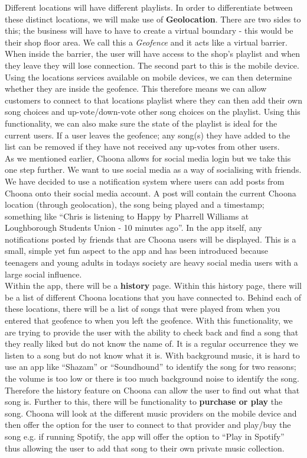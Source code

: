 Different locations will have different playlists.  In order to differentiate between these distinct locations, we will make use of \textbf{Geolocation}.  There are two sides to this; the business will have to have to create a virtual boundary - this would be their shop floor area.  We call this a \emph{Geofence} and it acts like a virtual barrier.  When inside the barrier, the user will have access to the shop's playlist and when they leave they will lose connection.  The second part to this is the mobile device.  Using the locations services available on mobile devices, we can then determine whether they are inside the geofence.  This therefore means we can allow customers to connect to that locations playlist where they can then add their own song choices and up-vote/down-vote other song choices on the playlist.  
Using this functionality, we can also make sure the state of the playlist is ideal for the current users.  If a user leaves the geofence; any song(s) they have added to the list can be removed if they have not received any up-votes from other users. \\

As we mentioned earlier, Choona allows for social media login but we take this one step further.  We want to use social media as a way of socialising with friends.  We have decided to use a notification system where users can add posts from Choona onto their social media account.  A post will contain the current Choona location (through geolocation), the song being played and a timestamp; something like ``Chris is listening to Happy by Pharrell Williams at Loughborough Students Union - 10 minutes ago''.    In the app itself, any notifications posted by friends that are Choona users will be displayed.  This is a small, simple yet fun aspect to the app and has been introduced because teenagers and young adults in todays society are heavy social media users with a large social influence.  \\

Within the app, there will be a \textbf{history} page.  Within this history page, there will be a list of different Choona locations that you have connected to.  Behind each of these locations, there will be a list of songs that were played from when you entered that geofence to when you left the geofence.  With this functionality, we are trying to provide the user with the ability to check back and find a song that they really liked but do not know the name of.  It is a regular occurrence they we listen to a song but do not know what it is.  With background music, it is hard to use an app like ``Shazam'' or ``Soundhound'' to identify the song for two reasons; the volume is too low or there is too much background noise to identify the song.  Therefore the history feature on Choona can allow the user to find out what that song is.  Further to this, there will be functionality to \textbf{purchase or play} the song.  Choona will look at the different music providers on the mobile device and then offer the option for the user to connect to that provider and play/buy the song e.g. if running Spotify, the app will offer the option to ``Play in Spotify'' thus allowing the user to add that song to their own private music collection.  \\

